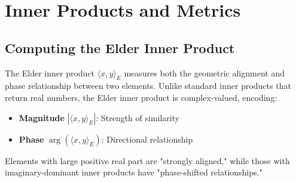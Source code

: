 
\chapter{Inner Products and Metrics}

\section{Computing the Elder Inner Product}

\begin{intuition}
The Elder inner product $\langle x, y \rangle_E$ measures both the geometric alignment and phase relationship between two elements. Unlike standard inner products that return real numbers, the Elder inner product is complex-valued, encoding:
\begin{itemize}
\item \textbf{Magnitude} $|\langle x, y \rangle_E|$: Strength of similarity
\item \textbf{Phase} $\arg(\langle x, y \rangle_E)$: Directional relationship
\end{itemize}

Elements with large positive real part are "strongly aligned," while those with imaginary-dominant inner products have "phase-shifted relationships."
\end{intuition}

